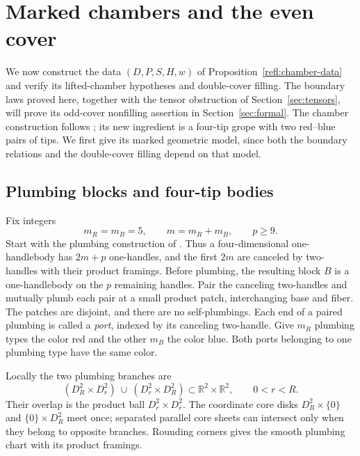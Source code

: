\section{Marked chambers and the even cover}
\label{sec:chambers}

We now construct the data $(D,P,S,H,w)$ of
Proposition~\ref{refl:chamber-data} and verify its lifted-chamber
hypotheses and double-cover filling.  The boundary laws proved here,
together with the tensor obstruction of Section~\ref{sec:tensors},
will prove its odd-cover nonfilling assertion in
Section~\ref{sec:formal}.  The chamber construction follows
\cite[Section~2]{PD}; its new ingredient is a four-tip grope with two
red--blue pairs of tips.  We first give its marked geometric model, since
both the boundary relations and the double-cover filling depend on that
model.

\subsection{Plumbing blocks and four-tip bodies}

Fix integers
\[
 m_R=m_B=5,\qquad m=m_R+m_B,\qquad p\geq9.
\]
Start with the plumbing construction of
\cite[Section~2.2, ``The plumbing blocks'']{MT}.  Thus a four-dimensional
one-handlebody has $2m+p$ one-handles, and the first $2m$ are canceled by
two-handles with their product framings.  Before plumbing, the resulting
block $B$ is a one-handlebody on the $p$ remaining handles.  Pair the
canceling two-handles and mutually plumb each pair at a small product
patch, interchanging base and fiber.  The patches are disjoint, and
there are no self-plumbings.  Each end of a paired plumbing is called a
\emph{port}, indexed by its canceling two-handle.  Give $m_R$ plumbing
types the color red and the other $m_B$ the color blue.  Both ports
belonging to one plumbing type have the same color.

Locally the two plumbing branches are
\begin{equation}
\label{ch:plumbing-chart}
 (D^2_R\times D^2_r)\ \cup\ (D^2_r\times D^2_R)
       \subset\mathbb R^2\times\mathbb R^2,
 \qquad 0<r<R.
\end{equation}
Their overlap is the product ball $D^2_r\times D^2_r$.
The coordinate core disks $D^2_R\times\{0\}$ and
$\{0\}\times D^2_R$ meet once; separated parallel core sheets
can intersect only when they belong to opposite branches.
Rounding corners gives the smooth plumbing chart with its
product framings.

